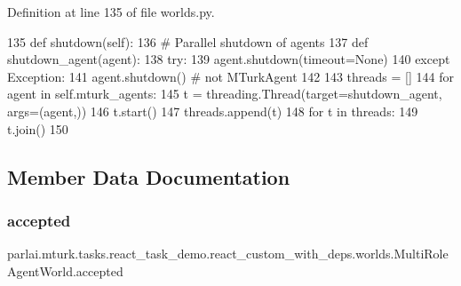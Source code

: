 Definition at line 135 of file worlds.\+py.


\begin{DoxyCode}
135     \textcolor{keyword}{def }shutdown(self):
136         \textcolor{comment}{# Parallel shutdown of agents}
137         \textcolor{keyword}{def }shutdown\_agent(agent):
138             \textcolor{keywordflow}{try}:
139                 agent.shutdown(timeout=\textcolor{keywordtype}{None})
140             \textcolor{keywordflow}{except} Exception:
141                 agent.shutdown()  \textcolor{comment}{# not MTurkAgent}
142 
143         threads = []
144         \textcolor{keywordflow}{for} agent \textcolor{keywordflow}{in} self.mturk\_agents:
145             t = threading.Thread(target=shutdown\_agent, args=(agent,))
146             t.start()
147             threads.append(t)
148         \textcolor{keywordflow}{for} t \textcolor{keywordflow}{in} threads:
149             t.join()
150 
\end{DoxyCode}


\subsection{Member Data Documentation}
\mbox{\label{classparlai_1_1mturk_1_1tasks_1_1react__task__demo_1_1react__custom__with__deps_1_1worlds_1_1MultiRoleAgentWorld_a98a36ba8ce62c0046d6ad89949babb38}} 
\subsubsection{\texorpdfstring{accepted}{accepted}}
{\footnotesize\ttfamily parlai.\+mturk.\+tasks.\+react\+\_\+task\+\_\+demo.\+react\+\_\+custom\+\_\+with\+\_\+deps.\+worlds.\+Multi\+Role\+Agent\+World.\+accepted}



